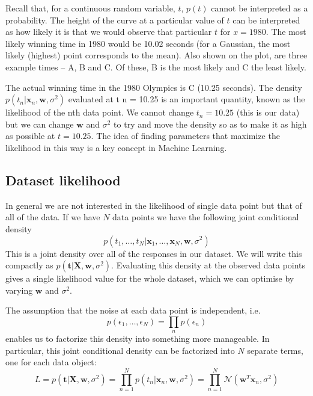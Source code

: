 Recall that, for a continuous random variable, $t$, $p(t)$ cannot be
interpreted as a probability. The height of the curve at a particular value of $t$ can be
interpreted as how likely it is that we would observe that particular $t$ for $x = 1980$.
The most likely winning time in 1980 would be 10.02 seconds (for a Gaussian, the
most likely (highest) point corresponds to the mean). Also shown on the plot, are
three example times – A, B and C. Of these, B is the most likely and C the least
likely.

The actual winning time in the 1980 Olympics is C (10.25 seconds).
The density $p(t_{n} | \mathbf{x}_n , \mathbf{w}, \sigma^2)$
evaluated at t n = 10.25 is an important quantity, known as the likelihood
of the nth data point. We cannot change $t_n = 10.25$ (this is our data) but
we can change $\mathbf{w}$ and $\sigma^2$ to try and move the density so as to make
it as high as possible at $t = 10.25$. The idea of finding parameters that maximize
the likelihood in this way is a key concept in Machine Learning.

\subsection{Dataset likelihood}

In general we are not interested in the likelihood of single data point but that of
all of the data. If we have $N$ data points we have the following joint conditional
density
\begin{equation*}
p(t_{1}, \ldots, t_{N} | \mathbf{x}_{1}, \ldots, \mathbf{x}_{N}, \mathbf{w}, \sigma^2)
\end{equation*}
This is a joint density over all of the responses in our dataset.
We will write this compactly
as $p( \mathbf{t} | \mathbf{X}, \mathbf{w}, \sigma^2)$.
Evaluating this density at the observed data points gives a single
likelihood value for the whole dataset, which we can optimise by varying $\mathbf{w}$
and $\sigma^2$.

The assumption that the noise at each data point is independent, i.e.
\begin{equation*}
p(\epsilon_{1}, \ldots, \epsilon_{N}) = \prod_{n} p(\epsilon_{n})
\end{equation*}
enables us to factorize this density into something more manageable. In
particular, this joint conditional density can be factorized into $N$ separate terms,
one for each data object:
\begin{equation}
L = p(\mathbf{t} | \mathbf{X},\mathbf{w},\sigma^2)
= \prod_{n=1}^{N} p(t_{n} | \mathbf{x}_{n},\mathbf{w},\sigma^2)
= \prod_{n=1}^{N} \mathcal{N}(\mathbf{w}^{T}\mathbf{x}_{n},\sigma^2)
\end{equation}

